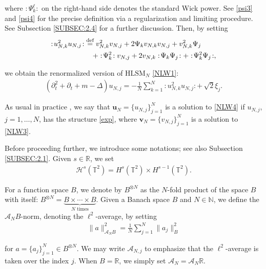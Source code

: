 \documentclass[letterpaper, 11pt,  reqno]{amsart}
\newcommand{\1}{\hspace{0.5mm}\text{I}\hspace{0.2mm}}
\newcommand{\noi}{\noindent}
\newcommand{\R}{\mathbb{R}}
\newcommand{\T}{\mathbb{T}}
\newcommand{\N}{\mathbb{N}}
\renewcommand{\H}{\mathcal{H}}
\newcommand{\Dl}{\Delta}
\newcommand{\dt}{\partial_t}
\newcommand{\A}{\mathcal{A}}
\newcommand{\HLS}{$\text{HLSM}_N$ }
\newcommand{\wick}[1]{:\!{#1}\!:}
\newcommand{\deff}{\stackrel{\textup{def}}{=}}
\newcommand{\vv}{\mathbf{v}}
\newcommand{\uu}{\mathbf{u}}
\renewcommand{\l}{\ell}
\numberwithin{equation}{section}
\numberwithin{theorem}{section}
\begin{document}
\noi
where 
$\wick{\Psi_k^\l}$ on the right-hand side denotes
the standard Wick power.
See 
\eqref{psi3} and \eqref{psi4}
for the precise definition
via a regularization and limiting procedure.
See Subsection \ref{SUBSEC:2.4} for a further discussion.
Then, by setting
\begin{align*}
\wick{ u_{N, k}^2 u_{N, j} } 
& \deff 
v_{N, k}^2 v_{N, j}
+ 2 \Psi_k v_{N, k} v_{N, j}
  + v_{N, k}^2 \Psi_j \\
& 
\quad \,
 + \wick{\Psi_k^2} v_{N, j} + 2 v_{N, k} \wick{ \Psi_k \Psi_j } 
+ \wick{\Psi_k^2 \Psi_j} , 
\end{align*}

\noi
we obtain the renormalized version of
\HLS \eqref{NLW1}:
\begin{align}
    (\dt^2 + \dt + m - \Dl) u_{N, j} = - \frac 1N \sum_{k = 1}^N \wick{u_{N, k}^2 u_{N, j}} + \, \sqrt{2} \xi_j.
\label{NLW4}
\end{align}

\noi
As usual in practice
\cite{GKO, GKOT}, 
we say that 
 $\uu_N = \{u_{N, j}\}_{j = 1}^N$ is a solution to \eqref{NLW4} if $u_{N, j}$, $j = 1, \dots, N$,  has the structure \eqref{exp}, 
 where  $\vv_N =  \{v_{N, j}\}_{j = 1}^N$ is  a solution to \eqref{NLW3}.







Before proceeding further, we introduce 
some notations; see also Subsection \ref{SUBSEC:2.1}.
Given $s \in \R$, we set 
\begin{align*}
    \H^s (\T^2) = H^s (\T^2) \times H^{s - 1} (\T^2).
\end{align*}


\noi
 For a function space $B$, we denote by $B^{\otimes N}$ as the $N$-fold product of the space $B$ with itself: $B^{\otimes N} = \underbrace{B \times \cdots \times B}_{N \text{ times}} $.
Given 
a Banach space $B$ and 
$N \in \N$, we define 
the $\A_N B$-norm, denoting the $\l^2$-average, by setting
\begin{align}
    \|  a \|_{\A_N B}^2 =  \frac{1}{N} \sum_{j = 1}^N \| a_j \|_B^2
\label{AN0} 
\end{align} 

\noi
for $ a = \{ a_j \}_{j = 1}^N \in B^{\otimes N}$. 
We may write $\A_{N, j}$ to emphasize 
that the $\l^2$-average is taken over the index $j$.
When $B = \R$, we simply set
$\A_N = \A_N \R$.
\end{document}

